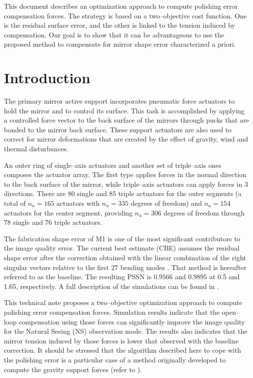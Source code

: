 \documentclass{gmto}
\begin{document}
This document describes an optimization approach to compute polishing error compensation forces. The strategy is based on a two--objective cost function. One is the residual surface error, and the other is linked to the tension induced by compensation. Our goal is to show that it can be advantageous to use the proposed method to compensate for mirror shape error characterized a priori.



\section{Introduction}
\label{sec:introduction}

The primary mirror active support incorporates pneumatic force actuators to hold the mirror and to control its surface. This task is accomplished by applying a controlled force vector to the back surface of the mirrors through pucks that are bonded to the mirror back surface. These support actuators are also used to correct for mirror deformations that are created by the effect of gravity, wind and thermal disturbances.

An outer ring of single--axis actuators and another set of triple--axis ones composes the actuator array. %
The first type applies forces in the normal direction to the back surface of the mirror, while triple--axis actuators can apply forces in $3$ directions. There are $80$ single and $85$ triple actuators for the outer segments (a total of $n_a=165$ actuators with $n_u = 335$ degrees of freedom) and $n_a=154$ actuators for the center segment, providing $n_u = 306$ degrees of freedom through $78$ single and $76$ triple actuators.


The fabrication shape error of M1 is one of the most significant contributors to the image quality error. The current best estimate (CBE) assumes the residual shape error after the correction obtained with the linear combination of the right singular vectors relative to the first $27$ bending modes \cite[Section 6.3.1.1]{GMT_DOC_04680}. That method is hereafter referred to as the baseline. The resulting PSSN is $0.9566$ and $0.9895$ at \SI{0.5}{\micron} and \SI{1.65}{\micron}, respectively. A full description of the simulations can be found in \cite{GMT_DOC_04637}.

This technical note proposes a two--objective optimization approach to compute polishing error compensation forces. Simulation results indicate that the open--loop compensation using those forces can significantly improve the image quality for the Natural Seeing (NS) observation mode. The results also indicates that the mirror tension induced by those forces is lower that observed with the baseline correction.%
It should be stressed that the algorithm described here to cope with the polishing error is a particular case of a method originally developed to compute the gravity support forces (refer to \cite{Romano2020a}).
\end{document}
